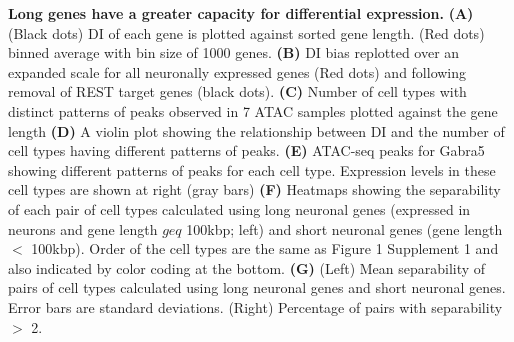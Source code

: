 \textbf{Long genes have a greater capacity for differential expression.}
\textbf{(A)} (Black dots) DI of each gene is plotted against sorted gene length. (Red dots) binned average with bin size of 1000 genes.
\textbf{(B)} DI bias replotted over an expanded scale for all neuronally expressed genes (Red dots) and following removal of REST target genes (black dots).
\textbf{(C)} Number of cell types with distinct patterns of peaks observed in 7 ATAC samples plotted against the gene length
\textbf{(D)} A violin plot showing the relationship between DI and the number of cell types having different patterns of peaks. 
\textbf{(E)} ATAC-seq peaks for Gabra5 showing different patterns of peaks for each cell type. Expression levels in these cell types are shown at right (gray bars)
\textbf{(F)} Heatmaps showing the separability of each pair of cell types calculated using long neuronal genes (expressed in neurons and gene length $geq$ 100kbp; left) and short neuronal genes (gene length $<$ 100kbp). Order of the cell types are the same as Figure 1 Supplement 1 and also indicated by color coding at the bottom. 
\textbf{(G)} (Left) Mean separability of pairs of cell types calculated using long neuronal genes and short neuronal genes. Error bars are standard deviations. (Right) Percentage of pairs with separability $>$ 2. 
